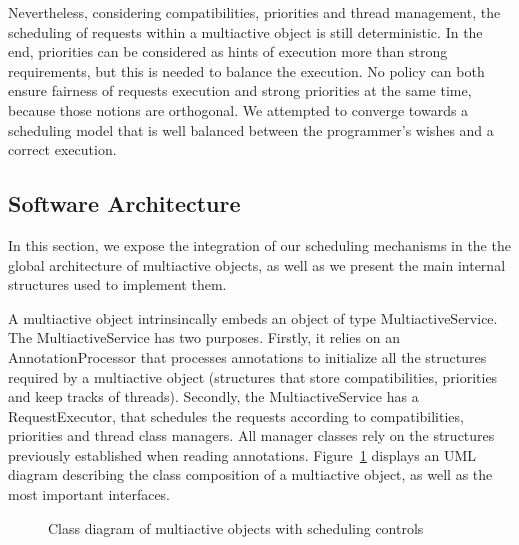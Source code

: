 \documentclass[11pt]{report}
\begin{document}
Nevertheless, considering compatibilities, priorities and thread management, the scheduling of requests within a multiactive object is still deterministic. In the end, priorities can be considered as hints of execution more than strong requirements, but this is needed to balance the execution. No policy can both ensure fairness of requests execution and strong priorities at the same time, because those notions are orthogonal. We attempted to converge towards a scheduling model that is well balanced between the programmer's wishes and a correct execution.


\subsection{Software Architecture}
In this section, we expose the integration of our scheduling mechanisms in the  the global architecture of multiactive objects, as well as we present the main internal structures used to implement them.

A multiactive object intrinsincally embeds an object of type MultiactiveService. The MultiactiveService has two purposes. Firstly, it relies on an AnnotationProcessor that processes annotations to initialize all the structures required by a multiactive object (structures that store compatibilities, priorities and keep tracks of threads). Secondly, the MultiactiveService has a RequestExecutor, that schedules the requests according to compatibilities, priorities and thread class managers. All manager classes rely on the structures previously established when reading annotations. Figure~\ref{fig:uml} displays an UML diagram describing the class composition of a multiactive object, as well as the most important interfaces.

\begin{figure}[!ht]
      \caption{Class diagram of multiactive objects with scheduling controls}
      \label{fig:uml} 
\end{figure}
\end{document}
